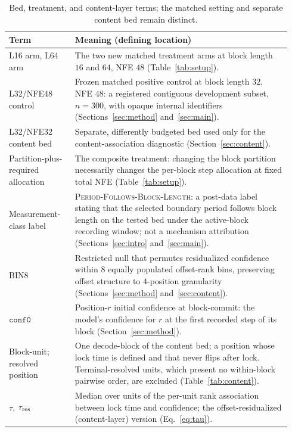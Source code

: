 \documentclass{article}
\begin{document}
\begin{table}[H]
\centering
\footnotesize
\setlength{\tabcolsep}{3pt}
\begin{tabular}{@{}>{\raggedright\arraybackslash}p{0.22\linewidth}
                    >{\raggedright\arraybackslash}p{0.72\linewidth}@{}}
\toprule
Term & Meaning (defining location) \\
\midrule
L16 arm, L64 arm & The two new matched treatment arms at block length
$16$ and $64$, NFE $48$ (Table~\ref{tab:setup}). \\
L32/NFE48 control & Frozen matched positive control at block length $32$,
NFE $48$: a registered contiguous development subset, $n{=}300$, with opaque
internal identifiers
(Sections~\ref{sec:method} and~\ref{sec:main}). \\
L32/NFE32 content bed & Separate, differently budgeted bed used only for the
content-association diagnostic (Section~\ref{sec:content}). \\
Partition-plus-required allocation & The composite treatment: changing the block
partition necessarily changes the per-block step allocation at fixed total NFE
(Table~\ref{tab:setup}). \\
Measurement-class label & \textsc{Period-Follows-Block-Length}: a post-data label stating that the selected
boundary period follows block length on the tested bed under the active-block
recording window; not a mechanism attribution
(Sections~\ref{sec:intro} and~\ref{sec:main}). \\
\textsc{BIN8} & Restricted null that permutes residualized confidence within $8$
equally populated offset-rank bins, preserving offset structure to
$4$-position granularity (Sections~\ref{sec:method} and~\ref{sec:content}). \\
$\texttt{conf0}$ & Position-$r$ initial confidence at block-commit: the model's
confidence for $r$ at the first recorded step of its block
(Section~\ref{sec:method}). \\
Block-unit; resolved position & One decode-block of the content bed; a position
whose lock time is defined and that never flips after lock. Terminal-resolved
units, which present no within-block pairwise order, are excluded
(Table~\ref{tab:content}). \\
$\tau$, $\tau_{\rm res}$ & Median over units of the per-unit rank association
between lock time and confidence; the offset-residualized (content-layer)
version (Eq.~\eqref{eq:tau}). \\
\bottomrule
\end{tabular}
\caption{Bed, treatment, and content-layer terms; the matched setting and separate
content bed remain distinct.}
\label{tab:beds}
\end{table}

\FloatBarrier
\end{document}
